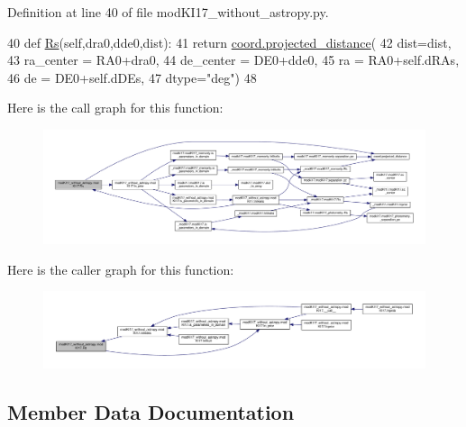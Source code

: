 Definition at line 40 of file mod\+K\+I17\+\_\+without\+\_\+astropy.\+py.


\begin{DoxyCode}
40     \textcolor{keyword}{def }\hyperlink{namespacedsph__model_af25a421d0de32d247b1aa0e8cf4894e3}{Rs}(self,dra0,dde0,dist):
41         \textcolor{keywordflow}{return} \hyperlink{namespacecoord_a46aebc3089e078f4597812fecdd0975f}{coord.projected\_distance}(
42             dist=dist,
43             ra\_center = RA0+dra0,
44             de\_center = DE0+dde0,
45             ra = RA0+self.dRAs,
46             de = DE0+self.dDEs,
47             dtype=\textcolor{stringliteral}{"deg"})
48 
\end{DoxyCode}
Here is the call graph for this function\+:\nopagebreak
\begin{figure}[H]
\begin{center}
\leavevmode
\includegraphics[width=350pt]{d3/df4/classmodKI17__without__astropy_1_1modKI17_a244312ee38d1fb267b6df28b53096c14_cgraph}
\end{center}
\end{figure}
Here is the caller graph for this function\+:\nopagebreak
\begin{figure}[H]
\begin{center}
\leavevmode
\includegraphics[width=350pt]{d3/df4/classmodKI17__without__astropy_1_1modKI17_a244312ee38d1fb267b6df28b53096c14_icgraph}
\end{center}
\end{figure}


\subsection{Member Data Documentation}
\mbox{\label{classmodKI17__without__astropy_1_1modKI17_a60e9915864f482b4fab62e671319cd2e}} 
